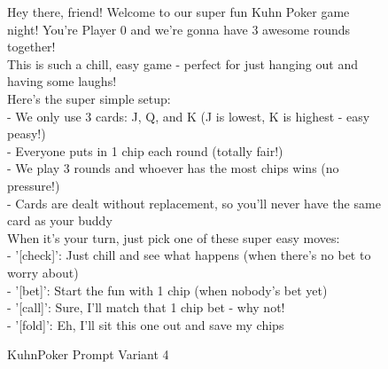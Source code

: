 \begin{figure}[H]
\centering

\begin{tcolorbox}[
    colback=blue!5!white,
    colframe=blue!40!white,
    left=1mm, right=1mm, top=1mm, bottom=1mm,
    width=\textwidth,
    enhanced,
    attach boxed title to top center={yshift=-2mm},
    boxed title style={colback=blue!40!white},
    title={Variant 4: Casual Friendly Theme},
    fontupper=\footnotesize,
    fonttitle=\small,
    label=box:variant4
]
Hey there, friend! Welcome to our super fun Kuhn Poker game night! You're Player 0 and we're gonna have 3 awesome rounds together!\\
This is such a chill, easy game - perfect for just hanging out and having some laughs!\\
Here's the super simple setup:\\
- We only use 3 cards: J, Q, and K (J is lowest, K is highest - easy peasy!)\\
- Everyone puts in 1 chip each round (totally fair!)\\
- We play 3 rounds and whoever has the most chips wins (no pressure!)\\
- Cards are dealt without replacement, so you'll never have the same card as your buddy\\

When it's your turn, just pick one of these super easy moves:\\
- '[check]': Just chill and see what happens (when there's no bet to worry about)\\
- '[bet]': Start the fun with 1 chip (when nobody's bet yet)\\
- '[call]': Sure, I'll match that 1 chip bet - why not!\\
- '[fold]': Eh, I'll sit this one out and save my chips
\end{tcolorbox}

\caption{KuhnPoker Prompt Variant 4} \label{fig:variant4_appendix}
\end{figure}

